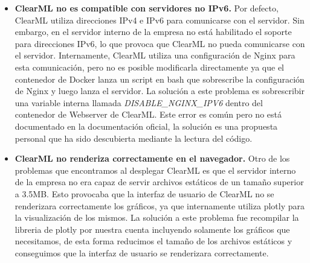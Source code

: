 \begin{itemize}
    \item \textbf{ClearML no es compatible con servidores no IPv6.} Por defecto,
    ClearML utiliza direcciones IPv4 e IPv6 para comunicarse con el servidor. Sin
    embargo, en el servidor interno de la empresa no está habilitado el soporte
    para direcciones IPv6, lo que provoca que ClearML no pueda comunicarse con el
    servidor. Internamente, ClearML utiliza una configuración de Nginx para esta
    comunicación, pero no es posible modificarla directamente ya que el contenedor de
    Docker lanza un script en bash que sobrescribe la configuración de Nginx y luego lanza
    el servidor. La solución a este problema es sobrescribir una variable interna llamada
    \textit{DISABLE\_NGINX\_IPV6} dentro del contenedor de Webserver de ClearML. Este
    error es común pero no está documentado en la documentación oficial, la solución
    es una propuesta personal que ha sido descubierta mediante la lectura del código.
    \item \textbf{ClearML no renderiza correctamente en el navegador.} Otro de los problemas
    que encontramos al desplegar ClearML es que el servidor interno de la empresa no
    era capaz de servir archivos estáticos de un tamaño superior a 3.5MB. Esto provocaba
    que la interfaz de usuario de ClearML no se renderizara correctamente los gráficos,
    ya que internamente utiliza plotly para la visualización de los mismos. La solución
    a este problema fue recompilar la libreria de plotly por nuestra cuenta incluyendo
    solamente los gráficos que necesitamos, de esta forma reducimos el tamaño de los
    archivos estáticos y conseguimos que la interfaz de usuario se renderizara correctamente.
\end{itemize}